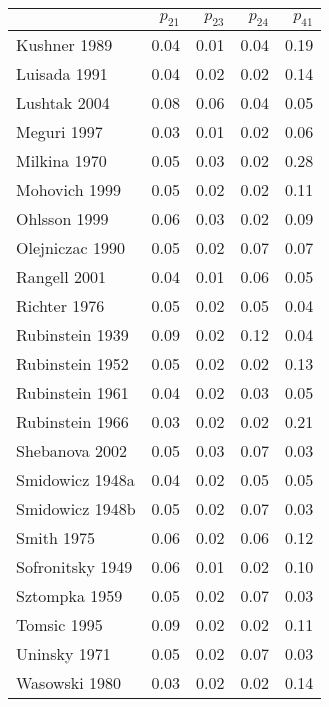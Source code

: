 \documentclass[12pt]{article}
\begin{document}
\begin{table}[H]
\centering
\begin{tabular}{lrrrr}
\toprule
  & $p_{21}$ & $p_{23}$ & $p_{24}$ & $p_{41}$\\
\midrule
\rowcolor{gray!6}  Kushner 1989 & 0.04 & 0.01 & 0.04 & 0.19\\
Luisada 1991 & 0.04 & 0.02 & 0.02 & 0.14\\
\rowcolor{gray!6}  Lushtak 2004 & 0.08 & 0.06 & 0.04 & 0.05\\
Meguri 1997 & 0.03 & 0.01 & 0.02 & 0.06\\
\rowcolor{gray!6}  Milkina 1970 & 0.05 & 0.03 & 0.02 & 0.28\\
\addlinespace
Mohovich 1999 & 0.05 & 0.02 & 0.02 & 0.11\\
\rowcolor{gray!6}  Ohlsson 1999 & 0.06 & 0.03 & 0.02 & 0.09\\
Olejniczac 1990 & 0.05 & 0.02 & 0.07 & 0.07\\
\rowcolor{gray!6}  Rangell 2001 & 0.04 & 0.01 & 0.06 & 0.05\\
Richter 1976 & 0.05 & 0.02 & 0.05 & 0.04\\
\addlinespace
\rowcolor{gray!6}  Rubinstein 1939 & 0.09 & 0.02 & 0.12 & 0.04\\
Rubinstein 1952 & 0.05 & 0.02 & 0.02 & 0.13\\
\rowcolor{gray!6}  Rubinstein 1961 & 0.04 & 0.02 & 0.03 & 0.05\\
Rubinstein 1966 & 0.03 & 0.02 & 0.02 & 0.21\\
\rowcolor{gray!6}  Shebanova 2002 & 0.05 & 0.03 & 0.07 & 0.03\\
\addlinespace
Smidowicz 1948a & 0.04 & 0.02 & 0.05 & 0.05\\
\rowcolor{gray!6}  Smidowicz 1948b & 0.05 & 0.02 & 0.07 & 0.03\\
Smith 1975 & 0.06 & 0.02 & 0.06 & 0.12\\
\rowcolor{gray!6}  Sofronitsky 1949 & 0.06 & 0.01 & 0.02 & 0.10\\
Sztompka 1959 & 0.05 & 0.02 & 0.07 & 0.03\\
\addlinespace
\rowcolor{gray!6}  Tomsic 1995 & 0.09 & 0.02 & 0.02 & 0.11\\
Uninsky 1971 & 0.05 & 0.02 & 0.07 & 0.03\\
\rowcolor{gray!6}  Wasowski 1980 & 0.03 & 0.02 & 0.02 & 0.14\\
\bottomrule
\end{tabular}
\end{table}
\end{document}
